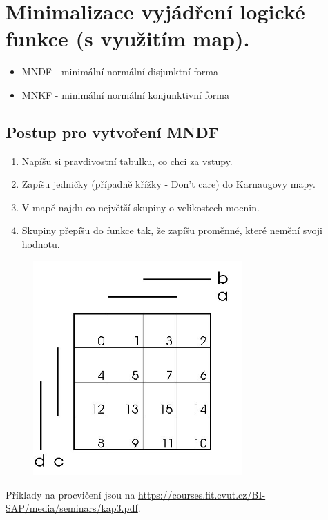 \documentclass{szzclass}
\begin{document}
\section{Minimalizace vyjádření logické funkce (s využitím map).}
\begin{itemize}
  \item MNDF - minimální normální disjunktní forma
  \item MNKF - minimální normální konjunktivní forma
\end{itemize}

\subsection{Postup pro vytvoření MNDF}
\begin{enumerate}
  \item Napíšu si pravdivostní tabulku, co chci za vstupy.
  \item Zapíšu jedničky (případně křížky - Don't care) do Karnaugovy mapy.
  \item V mapě najdu co největší skupiny o velikostech mocnin.
  \item Skupiny přepíšu do funkce tak, že zapíšu proměnné, které nemění svoji hodnotu.
\end{enumerate}

\begin{figure}[h]
\includegraphics[width=8cm]{karnaugh}
\end{figure}

Příklady na procvičení jsou na \url{https://courses.fit.cvut.cz/BI-SAP/media/seminars/kap3.pdf}.
\end{document}
